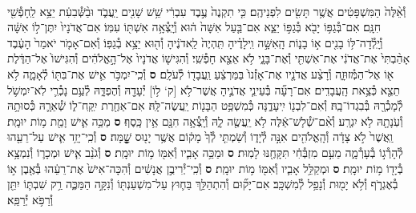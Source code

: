 \documentclass[twoside, openany, parskip=half, 11pt]{book}
\begin{document}
\begin{footnotesize}
\begin{multicols}{2}
\\
וְ֯אֵ֨לֶּה֙ הַמִּשְׁפָּטִ֔ים אֲשֶׁ֥ר תָּשִׂ֖ים לִפְנֵיהֶֽם׃ כִּ֤י תִקְנֶה֙ עֶ֣בֶד עִבְרִ֔י שֵׁ֥שׁ שָׁנִ֖ים יַֽעֲבֹ֑ד וּבַ֨שְּׁ֯בִעִ֔ת יֵצֵ֥א לַֽחָפְ֯שִׁ֖י חִנָּֽם׃ אִם־בְּ֯גַפּ֥וֹ יָבֹ֖א בְּ֯גַפּ֣וֹ יֵצֵ֑א אִם־בַּ֤עַל אִשָּׁה֙ ה֔וּא וְ֯יָֽצְ֯אָ֥ה אִשְׁתּ֖וֹ עִמּֽוֹ׃ אִם־אֲדֹנָיו֙ יִתֶּן־ל֣וֹ אִשָּׁ֔ה וְ֯יָֽלְ֯דָה־לּ֥וֹ בָנִ֖ים א֣וֹ בָנ֑וֹת הָֽאִשָּׁ֣ה וִֽילָדֶ֗יהָ תִּֽהְיֶה֙ לַֽאדֹנֶ֔יהָ וְ֯ה֖וּא יֵצֵ֥א בְ֯גַפּֽוֹ׃ וְ֯אִם־אָמֹ֤ר יֹאמַר֙ הָעֶ֔בֶד אָהַ֨בְתִּי֙ אֶת־אֲדֹנִ֔י אֶת־אִשְׁתִּ֖י וְ֯אֶת־בָּנָ֑י לֹ֥א אֵצֵ֖א חָפְ֯שִֽׁי׃ וְ֯הִגִּישׁ֤וֹ אֲדֹנָיו֙ אֶל־הָ֣אֱלֹהִ֔ים וְ֯הִגִּישׁוֹ֙ אֶל־הַדֶּ֔לֶת א֖וֹ אֶל־הַמְּ֯זוּזָ֑ה וְ֯רָצַ֨ע אֲדֹנָ֤יו אֶת־אָזְ֯נוֹ֙ בַּמַּרְצֵ֔עַ וַֽעֲבָד֖וֹ לְ֯עֹלָֽם׃ \textbf{ס}  וְ֯כִֽי־יִמְכֹּ֥ר אִ֛ישׁ אֶת־בִּתּ֖וֹ לְ֯אָמָ֑ה לֹ֥א תֵצֵ֖א כְּ֯צֵ֥את הָֽעֲבָדִֽים׃ אִם־רָעָ֞ה בְּ֯עֵינֵ֧י אֲדֹנֶ֛יהָ אֲשֶׁר־לֹ֥א [ק‘ ל֥וֹ] יְ֯עָדָ֖הּ וְ֯הֶפְדָּ֑הּ לְ֯עַ֥ם נָכְ֯רִ֛י לֹֽא־יִמְשֹׁ֥ל לְ֯מָכְ֯רָ֖הּ בְּ֯בִגְדוֹ־בָֽהּ׃ וְ֯אִם־לִבְנ֖וֹ יִֽיעָדֶ֑נָּה כְּ֯מִשְׁפַּ֥ט הַבָּנ֖וֹת יַֽעֲשֶׂה־לָּֽהּ׃ אִם־אַחֶ֖רֶת יִֽקַּֽח־ל֑וֹ שְׁ֯אֵרָ֛הּ כְּ֯סוּתָ֥הּ וְ֯עֹֽנָתָ֖הּ לֹ֥א יִגְרָֽע׃ וְ֯אִ֨ם־שְׁ֯לָשׁ־אֵ֔לֶּה לֹ֥א יַֽעֲשֶׂ֖ה לָ֑הּ וְ֯יָֽצְ֯אָ֥ה חִנָּ֖ם אֵ֥ין כָּֽסֶף׃ \textbf{ס}  מַכֵּ֥ה אִ֛ישׁ וָמֵ֖ת מ֥וֹת יוּמָֽת׃ וַֽאֲשֶׁר֙ לֹ֣א צָדָ֔ה וְ֯הָֽאֱלֹהִ֖ים אִנָּ֣ה לְ֯יָד֑וֹ וְ֯שַׂמְתִּ֤י לְ֯ךָ֙ מָק֔וֹם אֲשֶׁ֥ר יָנ֖וּס שׇׇׇׇׇׇׇׇֽׁמָּה׃ \textbf{ס} וְ֯כִֽי־יָזִ֥ד אִ֛ישׁ עַל־רֵעֵ֖הוּ לְ֯הָרְ֯ג֣וֹ בְ֯עָרְ֯מָ֑ה מֵעִ֣ם מִזְבְּ֯חִ֔י תִּקָּחֶ֖נּוּ לָמֽוּת׃ \textbf{ס} וּמַכֵּ֥ה אָבִ֛יו וְ֯אִמּ֖וֹ מ֥וֹת יוּמָֽת׃ \textbf{ס} וְ֯גֹנֵ֨ב אִ֧ישׁ וּמְכָר֛וֹ וְ֯נִמְצָ֥א בְ֯יָד֖וֹ מ֥וֹת יוּמָֽת׃ \textbf{ס} וּמְקַלֵּ֥ל אָבִ֛יו וְ֯אִמּ֖וֹ מ֥וֹת יוּמָֽת׃ \textbf{ס} וְ֯כִֽי־יְ֯רִיבֻ֣ן אֲנָשִׁ֔ים וְ֯הִכָּה־אִישׁ֙ אֶת־רֵעֵ֔הוּ בְּ֯אֶ֖בֶן א֣וֹ בְ֯אֶגְרֹ֑ף וְ֯לֹ֥א יָמ֖וּת וְ֯נָפַ֥ל לְ֯מִשְׁכָּֽב׃ אִם־יָק֞וּם וְ֯הִתְהַלֵּ֥ךְ בַּח֛וּץ עַל־מִשְׁעַנְתּ֖וֹ וְ֯נִקָּ֣ה הַמַּכֶּ֑ה רַ֥ק שִׁבְתּ֛וֹ יִתֵּ֖ן וְ֯רַפֹּ֥א יְ֯רַפֵּֽא׃


\end{multicols}
\end{footnotesize}
\end{document}
